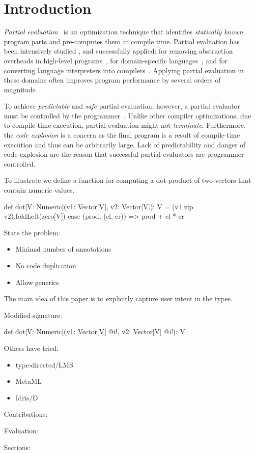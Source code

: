 \section{Introduction}
\label{sct:introduction}

\emph{Partial evaluation}~\cite{jones1993partial} is an optimization technique
that identifies \emph{statically known} program parts and pre-computes them at
compile time. Partial evaluation has been intensively studied \cite{}, and
successfully applied:  for removing abstraction overheads in high-level
programs~\cite{carette2005multi,rompf2012lightweight}, for domain-specific
languages~\cite{brady2010,jonnalagedda2014staged}, and for converting language
interpreters into compilers~\cite{futamura1999partial,lancet,wurthinger2013one}.
Applying partial evaluation in these domains often improves program performance
by several orders of magnitude~\cite{shali2011Hybrid,brady2010}.


To achieve \emph{predictable} and \emph{safe} partial evaluation, however, a
partial evaluator must be controlled by the
programmer~\cite{brady2010,le2004specialization}. Unlike other compiler
optimizations, due to compile-time execution, partial evaluation might not
\emph{terminate}. Furthermore, the \emph{code explosion} is a concern as the
final program is a result of compile-time execution and thus
can be arbitrarily large. Lack of predictability and danger of code explosion are
the reason that successful partial evaluators \cite{brady2010,taha_multi-stage_1997,rompf2012lightweight,wurthinger2013one} are programmer controlled.

To illustrate we define a function  for computing a dot-product of two vectors that contain numeric values.
\begin{listing}
def dot[V: Numeric](v1: Vector[V], v2: Vector[V]): V =
  (v1 zip v2).foldLeft(zero[V]){ case (prod, (cl, cr)) =>
    prod + cl * cr
  }
\end{listing}

State the problem:
\begin{itemize}
\item Minimal number of annotations
\item No code duplication
\item Allow generics
\end{itemize}

The main idea of this paper is to explicitly capture user intent in the types.

Modified signature:
\begin{listing}
def dot[V: Numeric](v1: Vector[V] @i!, v2: Vector[V] @i!): V
\end{listing}

Others have tried:
\begin{itemize}
\item type-directed/LMS
\item MetaML
\item Idris/D
\end{itemize}

Contributions:

Evaluation:

Sections:
